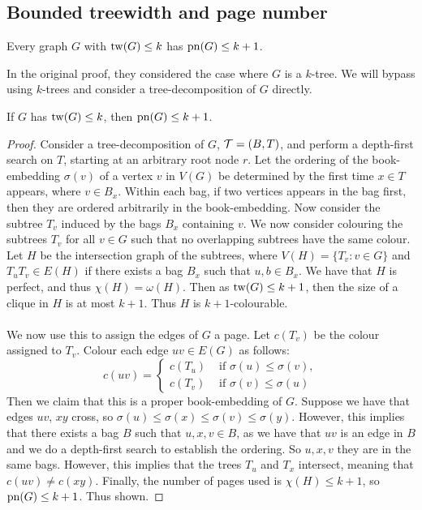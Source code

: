 \subsection{Bounded treewidth and page number}\label{ssec:Bounded_Treewidth}
\begin{theorem}\label{thm:bded_treewidth_bded_pagenumber}
	Every graph \(G\) with \(\operatorname{tw}(G) \leq k\) has \(\operatorname{pn}(G) \leq k + 1\). 
\end{theorem}
In the original proof, they considered the case where \(G\) is a \(k\)-tree. We will bypass using \(k\)-trees and consider a tree-decomposition of \(G\) directly. 

\begin{theorem}
	If \(G\) has \(\operatorname{tw}(G) \leq k\), then \(\operatorname{pn}(G) \leq k + 1\). 
\end{theorem}
\begin{proof}
	Consider a tree-decomposition of \(G\), \(\mathcal{T} = (B, T)\), and perform a depth-first search on \(T\), starting at an arbitrary root node \(r\). Let the ordering of the book-embedding \(\sigma(v)\) of a vertex \(v\) in \(V(G)\) be determined by the first time \(x \in T\) appears, where \(v \in B_x\). Within each bag, if two vertices appears in the bag first, then they are ordered arbitrarily in the book-embedding. Now consider the subtree \(T_v\) induced by the bags \(B_x\) containing \(v\). We now consider colouring the subtrees \(T_v\) for all \(v \in G\) such that no overlapping subtrees have the same colour. Let \(H\) be the intersection graph of the subtrees, where \(V(H) = \lbrace T_v : v \in G \rbrace\) and \(T_u T_v \in E(H)\) if there exists a bag \(B_x\) such that \(u, b \in B_x\). We have that \(H\) is perfect, and thus \(\chi(H) = \omega(H)\). Then as \(\operatorname{tw}(G) \leq k + 1\), then the size of a clique in \(H\) is at most \(k + 1\). Thus \(H\) is \(k + 1\)-colourable.
	\paragraph{}
	We now use this to assign the edges of \(G\) a page. Let \(c(T_v)\) be the colour assigned to \(T_v\). Colour each edge \(uv \in E(G)\) as follows:
	\begin{equation}
		c(uv) = 
		\begin{cases}
			c(T_u) &\text{ if } \sigma(u) \leq \sigma(v),\\
			c(T_v) &\text{ if } \sigma(v) \leq \sigma(u)
		\end{cases}
	\end{equation}
	Then we claim that this is a proper book-embedding of \(G\). Suppose we have that edges \(uv\), \(xy\) cross, so \(\sigma(u) \leq \sigma(x) \leq \sigma(v) \leq \sigma(y)\). However, this implies that there exists a bag \(B\) such that \(u, x, v \in B\), as we have that \(uv\) is an edge in \(B\) and we do a depth-first search to establish the ordering. So \(u, x, v\) they are in the same bags. However, this implies that the trees \(T_u\) and \(T_x\) intersect, meaning that \(c(uv) \neq c(xy)\). Finally, the number of pages used is \(\chi(H) \leq k + 1\), so \(\operatorname{pn}(G) \leq k + 1\). Thus shown.
\end{proof}

